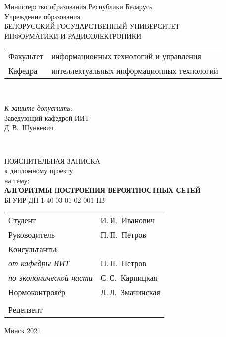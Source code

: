 \begin{titlepage}
  \begin{center}
    Министерство образования Республики Беларусь\\[1em]
    Учреждение образования\\
    БЕЛОРУССКИЙ ГОСУДАРСТВЕННЫЙ УНИВЕРСИТЕТ \\
    ИНФОРМАТИКИ И РАДИОЭЛЕКТРОНИКИ\\[1em]

    \begin{minipage}{\textwidth}
      \begin{flushleft}
        \begin{tabular}{ l l }
          Факультет & информационных технологий и управления\\
          Кафедра   & интеллектуальных информационных технологий
        \end{tabular}
      \end{flushleft}
    \end{minipage}\\[1em]

    \begin{flushright}
      \begin{minipage}{0.4\textwidth}
        \textit{К защите допустить:}\\[0.8em]
        Заведующий кафедрой ИИТ\\[0.45em]
        \underline{\hspace*{2.8cm}} Д.\,В.~Шункевич
      \end{minipage}\\[2.2em]
    \end{flushright}

    {ПОЯСНИТЕЛЬНАЯ ЗАПИСКА}\\
    {к дипломному проекту}\\
    {на тему:}\\[1em]
    \textbf{\large АЛГОРИТМЫ ПОСТРОЕНИЯ ВЕРОЯТНОСТНЫХ СЕТЕЙ}\\[1em]


    {БГУИР ДП 1-40 03 01 02 001 ПЗ}\\[2em]
    
    \begin{tabular}{ p{}p{} }
      Студент & И.\,И.~Иванович \\
      Руководитель & П.\,П.~Петров \\
      Консультанты: &\\
      \hspace*{3ex}\emph{от кафедры ИИТ} & П.\,П.~Петров \\
      \hspace*{3ex}\emph{по экономической части} & С.\,С.~Карпицкая \\
      Нормоконтролёр & Л.\,Л.~Змачинская\\
      & \\
      Рецензент &
    \end{tabular}
    
    \vfill
    {\normalsize Минск 2021}
  \end{center}
\end{titlepage}
